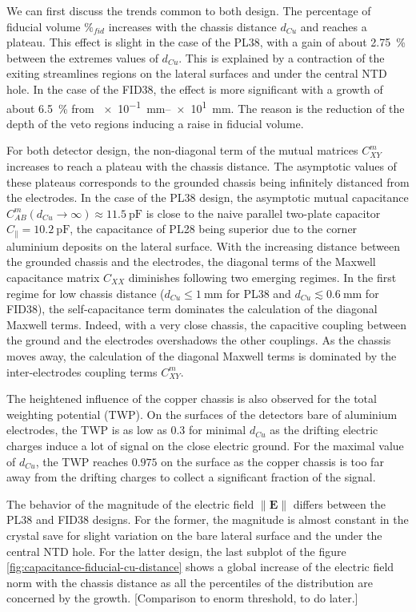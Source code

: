We can first discuss the trends common to both design. 
The percentage of fiducial volume $\%_{fid}$ increases with the chassis distance $d_{Cu}$ and reaches a plateau. This effect is slight in the case of the PL38, with a gain of about \SI{2.75}{\percent} between the extremes values of $d_{Cu}$. This is explained by a contraction of the exiting streamlines regions on the lateral surfaces and under the central NTD hole. In the case of the FID38, the effect is more significant with a growth of about \SI{6.5}{\percent} from \SIrange{e-1}{e1}{\mm}. The reason is the reduction of the depth of the veto regions inducing a raise in fiducial volume.

For both detector design, the non-diagonal term of the mutual matrices $C_{XY}^m$ increases to reach a plateau with the chassis distance. The asymptotic values of these plateaus corresponds to the grounded chassis being infinitely distanced from the electrodes. In the case of the PL38 design, the asymptotic mutual capacitance $C_{AB}^m(d_{Cu} \to \infty) \approx \SI{11.5}{\pico\farad}$ is close to the naive parallel two-plate capacitor $C_{\parallel} = \SI{10.2}{\pico\farad}$, the capacitance of PL28 being superior due to the corner aluminium deposits on the lateral surface. With the increasing distance between the grounded chassis and the electrodes, the diagonal terms of the Maxwell capacitance matrix $C_{XX}$ diminishes following two emerging regimes. In the first regime for low chassis distance ($d_{Cu} \leq \SI{1}{\mm}$ for PL38 and $d_{Cu} \lesssim \SI{0.6}{\mm}$ for FID38), the self-capacitance term dominates the calculation of the diagonal Maxwell terms. Indeed, with a very close chassis, the capacitive coupling between the ground and the electrodes overshadows the other couplings. As the chassis moves away, the calculation of the diagonal Maxwell terms is dominated by the inter-electrodes coupling terms $C_{XY}^m$. 

The heightened influence of the copper chassis is also observed for the total weighting potential (TWP). On the surfaces of the detectors bare of aluminium electrodes, the TWP is as low as $0.3$ for minimal $d_{Cu}$ as the drifting electric charges induce a lot of signal on the close electric ground. For the maximal value of $d_{Cu}$, the TWP reaches $0.975$ on the surface as the copper chassis is too far away from the drifting charges to collect a significant fraction of the signal.

The behavior of the magnitude of the electric field $\| \mathbf{E} \|$ differs between the PL38 and FID38 designs. For the former, the magnitude is almost constant in the crystal save for slight variation on the bare lateral surface and the under the central NTD hole. For the latter design, the last subplot of the figure \ref{fig:capacitance-fiducial-cu-distance} shows a global increase of the electric field norm with the chassis distance as all the percentiles of the distribution are concerned by the growth.
{\color{red} [Comparison to enorm threshold, to do later.]}

